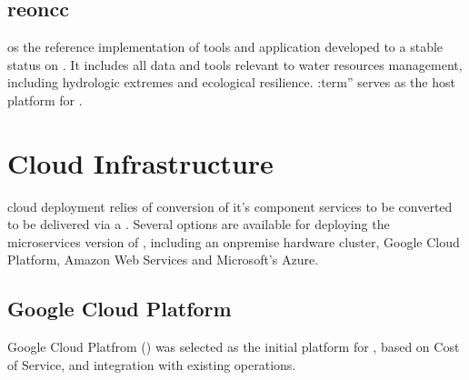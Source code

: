 \documentclass[letterpaper,12pt,english,openany,oneside]{sphinxmanual}
\begin{document}
\sphinxstepscope


\subsection{reoncc}
\label{\detokenize{euidev/development/_autosummary/reoncc:module-reoncc}}\label{\detokenize{euidev/development/_autosummary/reoncc:reoncc}}\label{\detokenize{euidev/development/_autosummary/reoncc::doc}}
\sphinxAtStartPar
{} os the reference implementation of tools and application developed to a stable status on . It includes all data and tools relevant to water resources management, including hydrologic extremes and ecological resilience. :term” serves as the host platform for .

\sphinxstepscope


\section{Cloud Infrastructure}
\label{\detokenize{euidev/infrastructure/index:cloud-infrastructure}}\label{\detokenize{euidev/infrastructure/index::doc}}
\sphinxAtStartPar
{} cloud deployment relies of conversion of it’s component services to be converted to be delivered via a . Several options are available for deploying the microservices version of , including an on\sphinxhyphen{}premise hardware cluster, Google Cloud Platform, Amazon Web Services and Microsoft’s Azure.


\subsection{Google Cloud Platform}
\label{\detokenize{euidev/infrastructure/index:google-cloud-platform}}
\sphinxAtStartPar
Google Cloud Platfrom () was selected as the initial platform for , based on Cost of Service, and integration with existing  operations.
\end{document}
